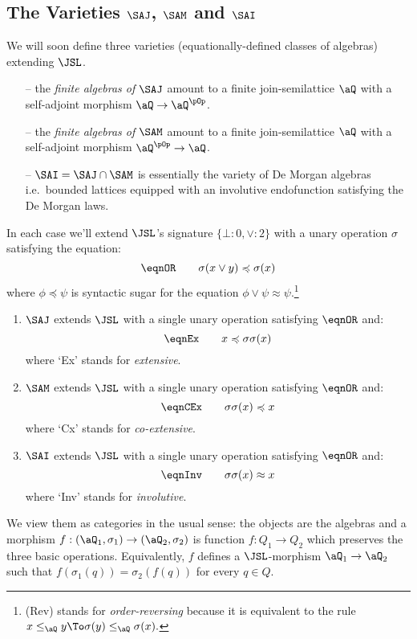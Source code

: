 \documentclass{article}
\begin{document}
\subsection{The Varieties $\SAJ$, $\SAM$ and $\SAI$}

We will soon define three varieties (equationally-defined classes of algebras) extending $\JSL$.

\begin{itemize}
\item[--]
the \emph{finite algebras of} $\SAJ$ amount to a finite join-semilattice $\aQ$ with a self-adjoint morphism $\aQ \to \aQ^{\pOp}$.
\item[--]
the \emph{finite algebras of} $\SAM$ amount to a finite join-semilattice $\aQ$ with a self-adjoint morphism $\aQ^{\pOp} \to \aQ$.
\item[--]
$\SAI = \SAJ \cap \SAM$ is essentially the variety of De Morgan algebras i.e.\ bounded lattices equipped with an involutive endofunction satisfying the De Morgan laws.
\end{itemize}

\begin{definition}
\item
In each case we'll extend $\JSL$'s signature $\{ \bot : 0, \lor : 2 \}$ with a unary operation $\sigma$ satisfying the equation:
\[
\eqnOR
\qquad
\sigma(x \lor y) \preccurlyeq \sigma(x)
\]
where $\phi \preccurlyeq \psi$ is syntactic sugar for the equation $\phi \lor \psi \approx \psi$.\footnote{(Rev) stands for \emph{order-reversing} because it is equivalent to the rule
$
x \leq_\aQ y
\To 
\sigma(y) \leq_\aQ \sigma(x).
$}

\begin{enumerate}
\item
$\SAJ$ extends $\JSL$ with a single unary operation satisfying $\eqnOR$ and:
\[
\eqnEx
\qquad
x \preccurlyeq \sigma\sigma(x)
\]
where `Ex' stands for \emph{extensive}.

\item
$\SAM$ extends $\JSL$ with a single unary operation satisfying $\eqnOR$ and:
\[
\eqnCEx
\qquad
\sigma\sigma(x) \preccurlyeq x
\]
where `Cx' stands for \emph{co-extensive}.

\item
$\SAI$ extends $\JSL$ with a single unary operation satisfying $\eqnOR$ and:
\[
\eqnInv
\qquad
\sigma\sigma(x) \approx x
\]
where `Inv' stands for \emph{involutive}.
\end{enumerate}

We view them as categories in the usual sense: the objects are the algebras and a morphism $f : (\aQ_1,\sigma_1) \to (\aQ_2,\sigma_2)$ is function $f : Q_1 \to Q_2$ which preserves the three basic operations. Equivalently, $f$ defines a $\JSL$-morphism $\aQ_1 \to \aQ_2$ such that $f(\sigma_1(q)) = \sigma_2(f(q))$ for every $q \in Q$.  \endbox
\end{definition}
\end{document}
